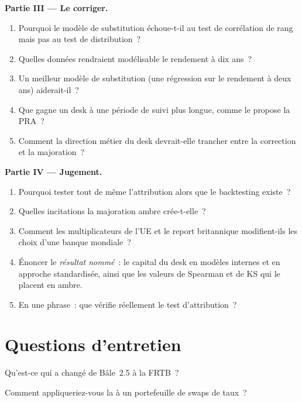 \begin{problem}
\medskip\noindent\textbf{Partie III --- Le corriger.}
\begin{enumerate}[resume]
\item Pourquoi le modèle de substitution échoue-t-il au test de corrélation de rang mais pas au test de distribution~?
\item Quelles données rendraient modélisable le rendement à dix ans~?
\item Un meilleur modèle de substitution (une régression sur le rendement à deux ans) aiderait-il~?
\item Que gagne un desk à une période de suivi plus longue, comme le propose la PRA~?
\item Comment la direction métier du desk devrait-elle trancher entre la correction et la majoration~?
\end{enumerate}

\medskip\noindent\textbf{Partie IV --- Jugement.}
\begin{enumerate}[resume]
\item Pourquoi tester tout de même l'attribution alors que le backtesting existe~?
\item Quelles incitations la majoration ambre crée-t-elle~?
\item Comment les multiplicateurs de l'UE et le report britannique modifient-ils les choix d'une banque mondiale~?
\item Énoncer le \emph{résultat nommé}~: le capital du desk en modèles internes et en approche standardisée, ainsi que les
valeurs de Spearman et de KS qui le placent en ambre.
\item En une phrase~: que vérifie réellement le test d'attribution~?
\end{enumerate}
\end{problem}

\section{Questions d'entretien}

\begin{interviewq}\label{iq:rc:regulatory-capital-for-trading-books:1}
Qu'est-ce qui a changé de Bâle~2.5 à la FRTB~?
\end{interviewq}

\begin{interviewq}\label{iq:rc:regulatory-capital-for-trading-books:2}
Comment appliqueriez-vous la  à un portefeuille de swaps de taux~?
\end{interviewq}

